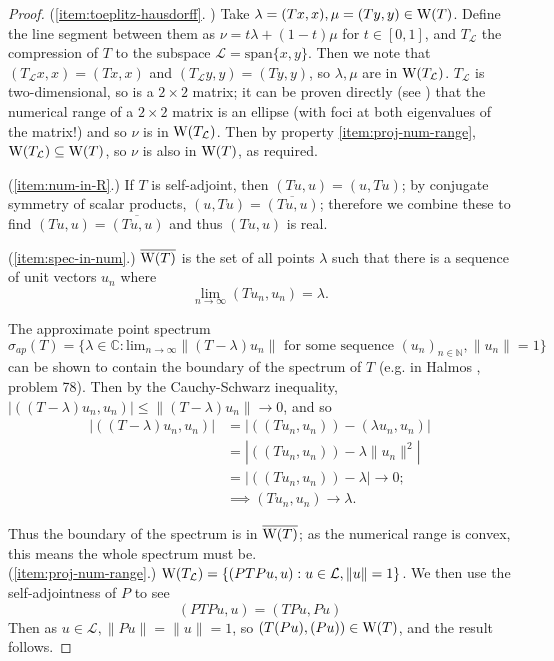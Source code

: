 \documentclass[../main.tex]{subfiles}
\begin{document}
\begin{proof}
(\ref{item:toeplitz-hausdorff}. \cite{gustafson1997numerical}) Take $\lambda = (Tx, x), \mu = (Ty, y) \in \mathrm{W}(T)$. Define the line segment between them as 
$\nu = t\lambda + (1-t)\mu$ for $t \in [0, 1]$, and $T_\mathcal{L}$ the compression of $T$ to the subspace 
$\mathcal{L} = \text{span}\{x, y\}$. Then we note that $(T_\mathcal{L} x, x) = (Tx, x)$ and $(T_\mathcal{L} y, y) = (Ty, y)$, so $\lambda, \mu$ are in
$\mathrm{W}(T_\mathcal{L})$. $T_\mathcal{L}$ is two-dimensional, so is a $2 \times 2$ matrix; it can be proven directly (see \cite{gustafson1997numerical}) that the numerical range of a $2 \times 2$ matrix is an ellipse (with foci at both eigenvalues of the matrix!) and so $\nu$ is in $\mathrm{W}(T_\mathcal{L})$.
Then by property \ref{item:proj-num-range}, $\mathrm{W}(T_\mathcal{L}) \subseteq \mathrm{W}(T)$, so $\nu$ is also in $\mathrm{W}(T)$, as required.

(\ref{item:num-in-R}.) If $T$ is self-adjoint, then $(Tu, u) = (u, Tu)$; by conjugate symmetry of scalar products, $(u, Tu) = \overline{(Tu, u)}$; therefore we combine these to find $(Tu, u) = \overline{(Tu, u)}$ and thus $(Tu, u)$ is real.

(\ref{item:spec-in-num}.) $\overline{\mathrm{W}(T)}$ is the set of all points $\lambda$ such that there is a sequence of unit vectors $u_n$ where
$$\lim_{n\rightarrow \infty}( Tu_n, u_n ) = \lambda.$$

The approximate point spectrum
$\sigma_{ap}(T) = \{\lambda \in \mathbb{C}: \text{lim}_{n \rightarrow \infty}\|(T - \lambda)u_n\| \text{ for some sequence } (u_n)_{n \in \mathbb{N}}, \|u_n\| = 1\}$
can be shown to contain the boundary of the spectrum of $T$ (e.g. in Halmos \cite{halmos1982hilbert}, problem 78). Then by the Cauchy-Schwarz inequality,
$|( (T - \lambda)u_n, u_n )| \leq \|(T - \lambda)u_n\| \rightarrow 0$, and so
\begin{equation*}
\begin{split}
|( (T - \lambda)u_n, u_n )| &  = |( (Tu_n, u_n) ) - ( \lambda u_n, u_n )| \\
& = |( (Tu_n, u_n) ) - \lambda \|u_n\|^2| \\
& = |( (Tu_n, u_n) ) - \lambda| \rightarrow 0; \\
& \implies ( Tu_n, u_n ) \rightarrow \lambda.
\end{split}
\end{equation*}

Thus the boundary of the spectrum is in $\overline{\mathrm{W}(T)}$; as the numerical range is convex,
this means the whole spectrum must be.\\

(\ref{item:proj-num-range}.) $\mathrm{W}(T_\mathcal{L}) = \{( PTPu, u ) : u \in \mathcal{L}, \|u\|=1\}$.
We then use the self-adjointness of $P$ to see
$$( PTPu, u ) = ( TPu, Pu )$$
Then as $u \in \mathcal{L}, \|Pu\| = \|u\| = 1$,
so $( T(Pu), (Pu) ) \in \mathrm{W}(T)$, and the result follows.

\end{proof}
\end{document}
